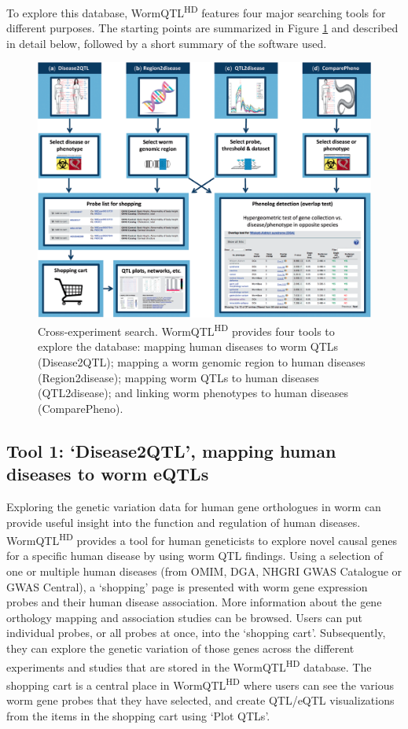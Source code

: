 To explore this database, WormQTL\textsuperscript{HD} features four major searching tools for different purposes. The starting points are summarized in Figure \ref{fig:wormqtl_overview} and described in detail below, followed by a short summary of the software used.


\begin{figure}
	\includegraphics[width=1.0\linewidth]{img/wormqtl_overview}
	\caption[Cross-experiment search]{Cross-experiment search. WormQTL\textsuperscript{HD} provides four tools to explore the database: mapping human diseases to worm QTLs (Disease2QTL); mapping a worm genomic region to human diseases (Region2disease); mapping worm QTLs to human diseases (QTL2disease); and linking worm phenotypes to human diseases (ComparePheno).}
	\label{fig:wormqtl_overview}
\end{figure}


\subsection[Tool 1: ‘Disease2QTL’]{Tool 1: ‘Disease2QTL’, mapping human diseases to worm eQTLs}
Exploring the genetic variation data for human gene orthologues in worm can provide useful insight into the function and regulation of human diseases. WormQTL\textsuperscript{HD} provides a tool for human geneticists to explore novel causal genes for a specific human disease by using worm QTL findings.
Using a selection of one or multiple human diseases (from OMIM, DGA, NHGRI GWAS Catalogue or GWAS Central), a ‘shopping’ page is presented with worm gene expression probes and their human disease association.
More information about the gene orthology mapping and association studies can be browsed.
Users can put individual probes, or all probes at once, into the ‘shopping cart’.
Subsequently, they can explore the genetic variation of those genes across the different experiments and studies that are stored in the WormQTL\textsuperscript{HD} database.
The shopping cart is a central place in WormQTL\textsuperscript{HD} where users can see the various worm gene probes that they have selected, and create QTL/eQTL visualizations from the items in the shopping cart using ‘Plot QTLs’.

